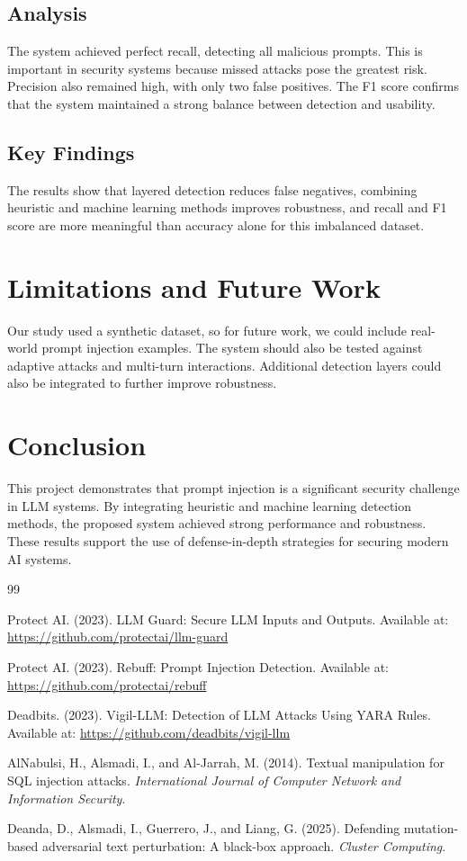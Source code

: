 \documentclass[10pt,leqno]{amsart}
\begin{document}
\subsection{Analysis}

The system achieved perfect recall, detecting all malicious prompts. This is important in security systems because missed attacks pose the greatest risk. Precision also remained high, with only two false positives. The F1 score confirms that the system maintained a strong balance between detection and usability.

\subsection{Key Findings}

The results show that layered detection reduces false negatives, combining heuristic and machine learning methods improves robustness, and recall and F1 score are more meaningful than accuracy alone for this imbalanced dataset.

\section{Limitations and Future Work}

Our study used a synthetic dataset, so for future work, we could include real-world prompt injection examples. The system should also be tested against adaptive attacks and multi-turn interactions. Additional detection layers could also be integrated to further improve robustness.

\section{Conclusion}

This project demonstrates that prompt injection is a significant security challenge in LLM systems. By integrating heuristic and machine learning detection methods, the proposed system achieved strong performance and robustness. These results support the use of defense-in-depth strategies for securing modern AI systems.

\begin{thebibliography}{99}

Protect AI. (2023).
LLM Guard: Secure LLM Inputs and Outputs.
Available at: \url{https://github.com/protectai/llm-guard}

Protect AI. (2023).
Rebuff: Prompt Injection Detection.
Available at: \url{https://github.com/protectai/rebuff}

Deadbits. (2023).
Vigil-LLM: Detection of LLM Attacks Using YARA Rules.
Available at: \url{https://github.com/deadbits/vigil-llm}

AlNabulsi, H., Alsmadi, I., and Al-Jarrah, M. (2014).
Textual manipulation for SQL injection attacks.
\textit{International Journal of Computer Network and Information Security}.

Deanda, D., Alsmadi, I., Guerrero, J., and Liang, G. (2025).
Defending mutation-based adversarial text perturbation: A black-box approach.
\textit{Cluster Computing}.

\end{thebibliography}
\end{document}

